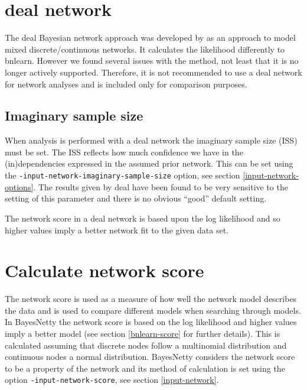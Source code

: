 \documentclass[a4paper,12pt]{article}
\newcommand{\code}[1]{{\footnotesize{{\tt #1}}}}
\begin{document}

\section{deal network}
\label{deal}

The deal Bayesian network approach was developed by \citet{deal} as an approach to model mixed discrete/continuous networks. It calculates the likelihood differently to bnlearn. However we found several issues with the method, not least that it is no longer actively supported. Therefore, it is not recommended to use a deal network for network analyses and is included only for comparison purposes. 
\subsection{Imaginary sample size}
\label{imaginary-sample-size}

When analysis is performed with a deal network the imaginary sample size (ISS) must be set. The ISS reflects how much confidence we have in the (in)dependencies expressed in the assumed prior network. This can be set using the \code{-input-network-imaginary-sample-size} option, see  section \ref{input-network-options}. The results given by deal have been found to be very sensitive to the setting of this parameter and there is no obvious ``good'' default setting. 

The network score in a deal network is based upon the log likelihood and so higher values imply a better network fit to the given data set. 




\section{Calculate network score}
\label{calc-score}

The network score is used as a measure of how well the network model describes the data and is used to compare different models when searching through models. In BayesNetty the network score is based on the log likelihood and higher values imply a better model (see  section \ref{bnlearn-score} for further details). This is calculated assuming that discrete nodes follow a multinomial distribution and continuous nodes a normal distribution. BayesNetty considers the network score to be a property of the network and its method of calculation is set using the option \code{-input-network-score}, see  section \ref{input-network}. 
\end{document}
